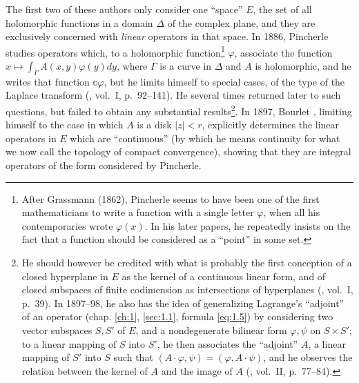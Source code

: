 \documentclass[12pt,a4paper,leqno,twoside]{extbook}
\begin{document}
The first two of these authors only consider one ``space'' \(E\), the set of all holomorphic functions in a domain \(\Delta\) of the complex plane, and they are exclusively concerned with \emph{linear} operators in that space. In 1886, Pincherle studies operators which, to a holomorphic function\footnote{After Grassmann (1862), Pincherle seems to have been one of the first mathematicians to write a function with a single letter \(\varphi\), when all his contemporaries wrote \(\varphi(x)\). In his later papers, he repeatedly insists on the fact that a function should be considered as a ``point'' in some set.} \(\varphi\), associate the function \(x \mapsto \int_\Gamma A(x, y) \varphi(y) dy\), where \(\Gamma\) is a curve in \(\Delta\) and \(A\) is holomorphic, and he writes that function \(\mathbb{a}\varphi\), but he limits himself to special cases, of the type of the Laplace transform (\cite{173}, vol.~I, p.~92--141). He several times returned later to such questions, but failed to obtain any substantial results\footnote{He should however be credited with what is probably the first conception of a closed hyperplane in \(E\) as the kernel of a continuous linear form, and of closed subspaces of finite codimension as intersections of hyperplanes (\cite{173}, vol.~I, p.~39). In 1897--98, he also has the idea of generalizing Lagrange's ``adjoint'' of an operator (chap. \ref{ch:1}, \ref{sec:1.1}, formula \eqref{eq:1.5}) by considering two vector subspaces \(S, S'\) of \(E\), and a nondegenerate bilinear form \(\varphi, \psi\) on \(S \times S'\); to a linear mapping of \(S\) into \(S'\), he then associates the ``adjoint'' \(A\), a linear mapping of \(S'\) into \(S\) such that \((A \cdot \varphi, \psi) = (\varphi, A \cdot \psi)\), and he observes the relation between the kernel of \(A\) and the image of \(A\) (\cite{173}, vol.~II, p.~77--84).}. In 1897, Bourlet \cite{029}, limiting himself to the case in which \(A\) is a disk \(|z| < r\), explicitly determines the linear operators in \(E\) which are ``continuous'' (by which he means continuity for what we now call the topology of compact convergence), showing that they are integral operators of the form considered by Pincherle.
\end{document}
